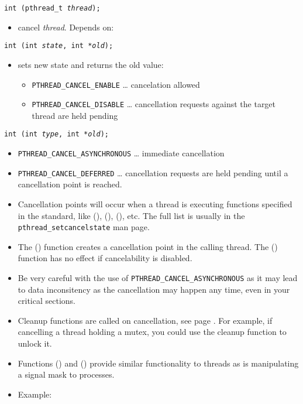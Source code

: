 \begin{slide}
\setlength{\baselineskip}{0.9\baselineskip}
\texttt{int (pthread\_t \emph{thread});}
\begin{itemize}
\item cancel \emph{thread}.  Depends on:
\end{itemize}
\texttt{int (int \emph{state},
int *\emph{old});}
\begin{itemize}
\item sets new state and returns the old value:
    \begin{itemize}
    \item \texttt{PTHREAD\_CANCEL\_ENABLE} \dots{} cancelation allowed
    \item \texttt{PTHREAD\_CANCEL\_DISABLE} \dots{} cancellation requests
    against the target thread are held pending
    \end{itemize}
\end{itemize}
\texttt{int (int \emph{type}, int *\emph{old});}
\begin{itemize}
\item \texttt{PTHREAD\_CANCEL\_ASYNCHRONOUS} \dots{} immediate cancellation
\item \texttt{PTHREAD\_CANCEL\_DEFERRED} \dots{} cancellation requests are held
pending until a cancellation point is reached.
\end{itemize}
\end{slide}

\begin{itemize}
\item Cancellation points will occur when a thread is executing functions
specified in the standard, like (), (),
(), etc.  The full list is usually in the
\texttt{pthread\_setcancelstate} man page.
\item The () function creates a cancellation point in
the calling thread.  The () function has no effect if
cancelability is disabled.
\item Be very careful with the use of \texttt{PTHREAD\_CANCEL\_ASYNCHRONOUS} as
it may lead to data inconsitency as the cancellation may happen any time, even
in your critical sections.
\item Cleanup functions are called on cancellation, see page
\pageref{PTHREAD_CLEANUP}.  For example, if cancelling a thread holding a mutex,
you could use the cleanup function to unlock it.
\item Functions () and
() provide similar functionality to threads as is
manipulating a signal mask to processes.
\item \label{PTHREAD_CANCEL} Example: 
\end{itemize}

